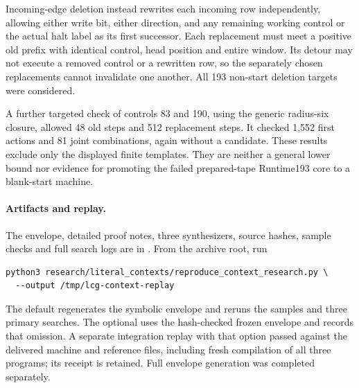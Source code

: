 Incoming-edge deletion instead rewrites each incoming row independently,
allowing either write bit, either direction, and any remaining working
control or the actual halt label as its first successor. Each replacement
must meet a positive old prefix with identical control, head position and
entire window. Its detour may not execute a removed control or a rewritten
row, so the separately chosen replacements cannot invalidate one another.
All 193 non-start deletion targets were considered.

A further targeted check of controls 83 and 190, using the generic
radius-six closure, allowed 48 old steps and 512 replacement steps. It
checked 1,552 first actions and 81 joint combinations, again without a
candidate. These results exclude only the displayed finite templates.
They are neither a general lower bound nor evidence for promoting the
failed prepared-tape Runtime193 core to a blank-start machine.

\paragraph{Artifacts and replay.}
The envelope, detailed proof notes, three synthesizers, source hashes,
sample checks and full search logs are in
. From the archive root, run
\begin{verbatim}
python3 research/literal_contexts/reproduce_context_research.py \
  --output /tmp/lcg-context-replay
\end{verbatim}
The default regenerates the symbolic envelope and reruns the samples and
three primary searches. The optional \file{--reuse-contexts} uses the
hash-checked frozen envelope and records that omission. A separate
integration replay with that option passed against the delivered machine
and reference files, including fresh compilation of all three programs;
its receipt is retained. Full envelope generation was completed separately.
